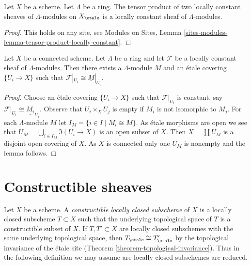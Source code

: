 \begin{lemma}
\label{lemma-tensor-product-locally-constant}
Let $X$ be a scheme. Let $\Lambda$ be a ring.
The tensor product of two locally constant sheaves of $\Lambda$-modules
on $X_\etale$ is a locally constant sheaf of $\Lambda$-modules.
\end{lemma}

\begin{proof}
This holds on any site, see
Modules on Sites, Lemma
\ref{sites-modules-lemma-tensor-product-locally-constant}.
\end{proof}

\begin{lemma}
\label{lemma-connected-locally-constant}
Let $X$ be a connected scheme. Let $\Lambda$ be a ring and let
$\mathcal{F}$ be a locally constant sheaf of $\Lambda$-modules.
Then there exists a $\Lambda$-module $M$ and an \'etale covering
$\{U_i \to X\}$ such that $\mathcal{F}|_{U_i} \cong \underline{M}|_{U_i}$.
\end{lemma}

\begin{proof}
Choose an \'etale covering
$\{U_i \to X\}$ such that $\mathcal{F}|_{U_i}$ is constant, say
$\mathcal{F}|_{U_i} \cong \underline{M_i}_{U_i}$.
Observe that $U_i \times_X U_j$ is empty if $M_i$ is not isomorphic
to $M_j$.
For each $\Lambda$-module $M$ let $I_M = \{i \in I \mid M_i \cong M\}$.
As \'etale morphisms are open we see that
$U_M = \bigcup_{i \in I_M} \Im(U_i \to X)$
is an open subset of $X$. Then $X = \coprod U_M$ is a disjoint
open covering of $X$. As $X$ is connected only one $U_M$ is nonempty
and the lemma follows.
\end{proof}




\section{Constructible sheaves}
\label{section-constructible}

\noindent
Let $X$ be a scheme. A {\it constructible locally closed subscheme} of $X$
is a locally closed subscheme $T \subset X$ such that the underlying
topological space of $T$ is a constructible subset of $X$.
If $T, T' \subset X$ are locally
closed subschemes with the same underlying topological space, then
$T_\etale \cong T'_\etale$ by the topological
invariance of the \'etale site (Theorem \ref{theorem-topological-invariance}).
Thus in the following definition we may assume are locally closed
subschemes are reduced.

